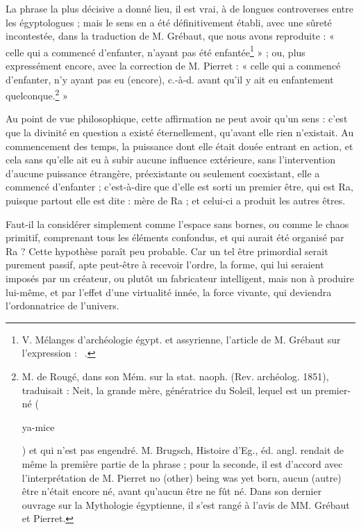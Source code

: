 \documentclass[letterpaper,twocolumn,openany,nodeprecatedcode]{dndbook}
\newcommand*\hieroAACS{}
\newcommand*\hieroAANC{}
\newcommand*\hieroABCM{}
\begin{document}
La phrase la plus décisive a donné lieu, il est vrai, à de longues controverses entre les égyptologues ; mais le sens en a été définitivement établi, avec une sûreté incontestée, dans la traduction de M. Grébaut, que nous avons reproduite : « celle qui a commencé d'enfanter, n'ayant pas été enfantée\footnote{V. Mélanges d'archéologie égypt. et assyrienne, l'article de M. Grébaut sur l'expression : $\hieroABCM\:\hieroAANC\:\hieroAACS$.} » ; ou, plus expressément encore, avec la correction de M. Pierret : « celle qui a commencé d'enfanter, n'y ayant pas eu (encore), c.-à-d. avant qu'il y ait eu enfantement quelconque.\footnote{M. de Rougé, dans son Mém. sur la stat. naoph. (Rev. archéolog. 1851), traduisait : Neit, la grande mère, génératrice du Soleil, lequel est un premier-né (\begin{coptic}ya-mice\end{coptic}) et qui n'est pas engendré. M. Brugsch, Histoire d'Eg., éd. angl. rendait de même la première partie de la phrase ; pour la seconde, il est d'accord avec l'interprétation de M. Pierret no (other) being was yet born, aucun (autre) être n'était encore né, avant qu'aucun être ne fût né. Dans son dernier ouvrage sur la Mythologie égyptienne, il s'est rangé à l'avis de MM. Grébaut et Pierret.} »

Au point de vue philosophique, cette affirmation ne peut avoir qu'un sens : c'est que la divinité en question a existé éternellement, qu'avant elle rien n'existait. Au commencement des temps, la puissance dont elle était douée entrant en action, et cela sans qu'elle ait eu à subir aucune influence extérieure, sans l'intervention d'aucune puissance étrangère, préexistante ou seulement coexistant, elle a commencé d'enfanter ; c'est-à-dire que d'elle est sorti un premier être, qui est Ra, puisque partout elle est dite : mère de Ra ; et celui-ci a produit les autres êtres.

Faut-il la considérer simplement comme l'espace sans bornes, ou comme le chaos primitif, comprenant tous les éléments confondus, et qui aurait été organisé par Ra ? Cette hypothèse paraît peu probable. Car un tel être primordial serait purement passif, apte peut-être à recevoir l'ordre, la forme, qui lui seraient imposés par un créateur, ou plutôt un fabricateur intelligent, mais non à produire lui-même, et par l'effet d'une virtualité innée, la force vivante, qui deviendra l'ordonnatrice de l'univers.
\end{document}
